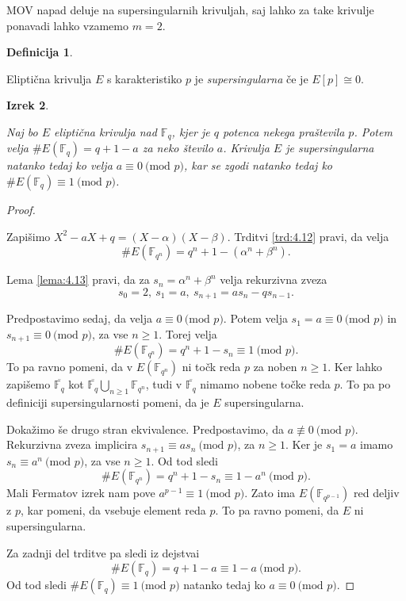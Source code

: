 \documentclass[12pt,a4paper,twoside]{article}
\theoremstyle{definition} %
\newtheorem{definicija}{Definicija}[section]
\theoremstyle{plain} %
\newtheorem{izrek}[definicija]{Izrek}
\numberwithin{equation}{section}  %
\newcommand{\F}{\mathbb F}
\newcommand{\Fq}[1]{{\mathbb{F}_{#1}}}
\newcommand{\E}[1]{E({#1})}
\newcommand{\MOD}[1]{\ \text{(mod }{#1}\text{)}}
\begin{document}
MOV napad deluje na supersingularnih krivuljah, saj lahko za take krivulje ponavadi lahko vzamemo $m=2$.

\begin{definicija}~

Eliptična krivulja $E$ s karakteristiko $p$ je \emph{supersingularna} če je $E[p] \cong 0$.
\end{definicija}


\begin{izrek}~

Naj bo $E$ eliptična krivulja nad $\F_q$, kjer je $q$ potenca nekega praštevila $p$. Potem velja $\#\E{\F_q} = q+1-a$ za neko število $a$. Krivulja $E$ je supersingularna natanko tedaj ko  velja $a \equiv 0 \MOD{p}$, kar se zgodi natanko tedaj ko $\# \E{\Fq{q}} \equiv 1 \MOD{p}$.
\end{izrek}

\begin{proof}~

Zapišimo $X^2-aX+q = (X-\alpha)(X-\beta)$. Trditvi \ref{trd:4.12} pravi, da velja
$$\# \E{\Fq{q^n}}  = q^n+1-(\alpha^n+\beta^n). $$

Lema \ref{lema:4.13} pravi, da za $s_n = \alpha^n + \beta^n$ velja rekurzivna zveza
$$s_0 = 2, \ s_1=a,\ s_{n+1} = as_n-qs_{n-1}.$$

Predpostavimo sedaj, da velja $a\equiv 0 \MOD{p}$. Potem velja $s_1 = a\equiv 0 \MOD{p}$ in $s_{n+1} \equiv 0 \MOD{p}$, za vse $n\geq 1$.
Torej velja
$$\# \E{\Fq{q^n}}  = q^n+1-s_n \equiv 1 \MOD{p}.$$
To pa ravno pomeni, da v $\E{\Fq{q^n}} $ ni točk reda $p$ za noben $n\geq 1$. Ker lahko zapišemo $\overline{\Fq{q}}$ kot $\overline{\Fq{q}} \bigcup_{n \geq 1} \Fq{q^n}$, tudi v $\overline{\Fq{q}}$ nimamo nobene točke reda $p$. To pa po definiciji supersingularnosti pomeni, da je $E$ supersingularna.

Dokažimo še drugo stran ekvivalence.
Predpostavimo, da $a \not \equiv 0 \MOD{p}$. Rekurzivna zveza implicira $s_{n+1} \equiv as_n \MOD{p}$, za $n \geq 1$. Ker je $s_1 = a$ imamo $s_n \equiv a^n \MOD{p}$, za vse $n \geq 1$.
Od tod sledi
$$\# \E{\Fq{q^n}}  = q^n+1-s_n \equiv 1-a^n \MOD{p}.$$
Mali Fermatov izrek nam pove $a^{p-1} \equiv 1 \MOD{p}$. Zato ima $E(\Fq{q^{p-1}})$ red deljiv z $p$, kar pomeni, da vsebuje element reda $p$. To pa ravno pomeni, da $E$ ni supersingularna.

Za zadnji del trditve pa sledi iz dejstvai
$$\# \E{\Fq{q}}  = q+1-a \equiv 1-a \MOD{p}.$$
Od tod sledi $\# \E{\Fq{q}} \equiv 1 \MOD{p}$ natanko tedaj ko $a\equiv 0 \MOD{p}$.
\end{proof}
\end{document}
